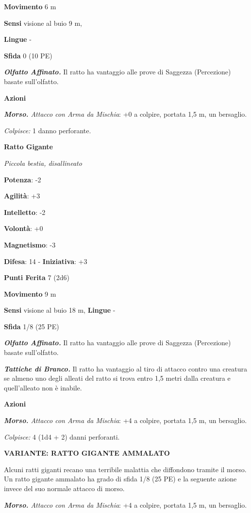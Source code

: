 \begin{multicols}{2}
\textbf{Movimento} 6 m

\textbf{Sensi} visione al buio 9 m, 

\textbf{Lingue} -

\textbf{Sfida} 0 (10 PE)

\emph{\textbf{Olfatto Affinato.}} Il ratto ha vantaggio alle prove di
Saggezza (Percezione) basate sull'olfatto.

\textbf{Azioni}

\emph{\textbf{Morso.} Attacco con Arma da Mischia}: +0 a colpire,
portata 1,5 m, un bersaglio.

\emph{Colpisce:} 1 danno perforante.

\textbf{Ratto Gigante}

\emph{Piccola bestia, disallineato}

\textbf{Potenza}: -2

\textbf{Agilità}: +3

\textbf{Intelletto}: -2

\textbf{Volontà}: +0

\textbf{Magnetismo}: -3

\textbf{Difesa}: 14 - \textbf{Iniziativa}: +3

\textbf{Punti Ferita} 7 (2d6)

\textbf{Movimento} 9 m

\textbf{Sensi} visione al buio 18 m, 
\textbf{Lingue} -

\textbf{Sfida} 1/8 (25 PE)

\emph{\textbf{Olfatto Affinato.}} Il ratto ha vantaggio alle prove di
Saggezza (Percezione) basate sull'olfatto.

\emph{\textbf{Tattiche di Branco.}} Il ratto ha vantaggio al tiro di
attacco contro una creatura se almeno uno degli alleati del ratto si
trova entro 1,5 metri dalla creatura e quell'alleato non è inabile.

\textbf{Azioni}

\emph{\textbf{Morso.} Attacco con Arma da Mischia}: +4 a colpire,
portata 1,5 m, un bersaglio.

\emph{Colpisce:} 4 (1d4 + 2) danni perforanti.

\textbf{VARIANTE: RATTO GIGANTE AMMALATO}

Alcuni ratti giganti recano una terribile malattia che diffondono
tramite il morso. Un ratto gigante ammalato ha grado di sfida 1/8 (25
PE) e la seguente azione invece del suo normale attacco di morso.

\emph{\textbf{Morso.} Attacco con Arma da Mischia}: +4 a colpire,
portata 1,5 m, un bersaglio.


\end{multicols}
